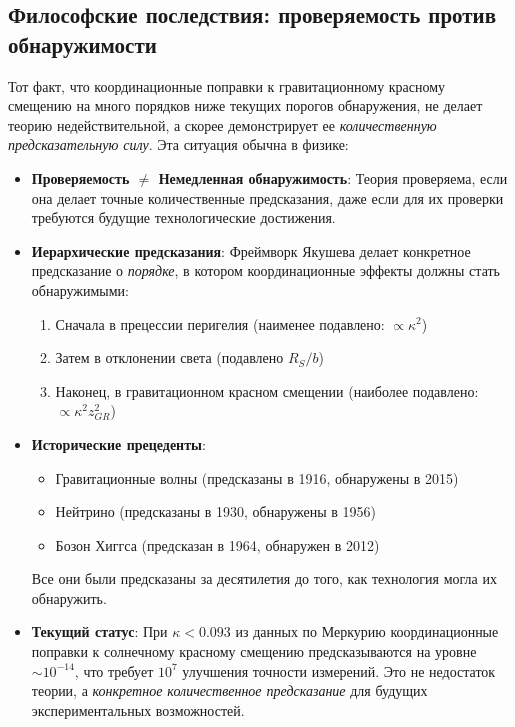\documentclass[11pt,a4paper]{article}
\begin{document}
	\subsection{Философские последствия: проверяемость против обнаружимости}
	\label{subsec:philosophy-testability}
	
	Тот факт, что координационные поправки к гравитационному красному смещению на много порядков ниже текущих порогов обнаружения, не делает теорию недействительной, а скорее демонстрирует ее \emph{количественную предсказательную силу}. Эта ситуация обычна в физике:
	
	\begin{itemize}
		\item \textbf{Проверяемость $\neq$ Немедленная обнаружимость}: Теория проверяема, если она делает точные количественные предсказания, даже если для их проверки требуются будущие технологические достижения.
		
		\item \textbf{Иерархические предсказания}: Фреймворк Якушева делает конкретное предсказание о \emph{порядке}, в котором координационные эффекты должны стать обнаружимыми:
		\begin{enumerate}
			\item Сначала в прецессии перигелия (наименее подавлено: $\propto \kappa^2$)
			\item Затем в отклонении света (подавлено $R_S/b$)
			\item Наконец, в гравитационном красном смещении (наиболее подавлено: $\propto \kappa^2 z_{GR}^2$)
		\end{enumerate}
		
		\item \textbf{Исторические прецеденты}:
		\begin{itemize}
			\item Гравитационные волны (предсказаны в 1916, обнаружены в 2015)
			\item Нейтрино (предсказаны в 1930, обнаружены в 1956)
			\item Бозон Хиггса (предсказан в 1964, обнаружен в 2012)
		\end{itemize}
		Все они были предсказаны за десятилетия до того, как технология могла их обнаружить.
		
		\item \textbf{Текущий статус}: При $\kappa < 0.093$ из данных по Меркурию координационные поправки к солнечному красному смещению предсказываются на уровне $\sim 10^{-14}$, что требует $10^7$ улучшения точности измерений. Это не недостаток теории, а \emph{конкретное количественное предсказание} для будущих экспериментальных возможностей.
	\end{itemize}
	
\end{document}
